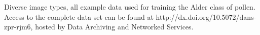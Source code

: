 \label{fig:trainingImages}
Diverse image types, all example data used for training the Alder class of pollen. Access to the complete data set can be found at http://dx.doi.org/10.5072/dans-zpr-rjm6, hosted by Data Archiving and Networked Services.
  
  
